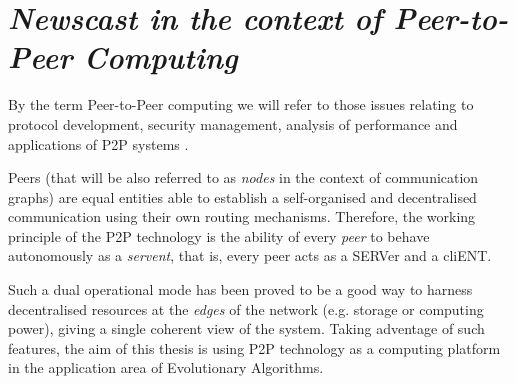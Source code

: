 

\chapter{\textit{Newscast in the context of Peer-to-Peer Computing}}
\label{cap:p2pcompt}



By the term Peer-to-Peer computing we will refer to those issues relating to protocol development, security management, analysis of performance and applications of P2P systems \cite{DBLP:conf/p2p/2005lncs}. 

Peers (that will be also referred to as \emph{nodes} in the context of
communication graphs) are equal entities able to establish a
self-organised and decentralised communication using their own routing
mechanisms. Therefore, the working principle of the P2P technology
is the ability of every \emph{peer} to behave autonomously as a
\emph{servent}, that is, every peer acts as a SERVer and a
cliENT.

Such a dual operational mode has been proved to be a good way to
harness decentralised resources at the \emph{edges} of the network
(e.g. storage or computing power), giving a single coherent view of the
system. Taking adventage of such features, the aim of this thesis is using P2P technology as a computing platform in the application area of Evolutionary Algorithms. 

